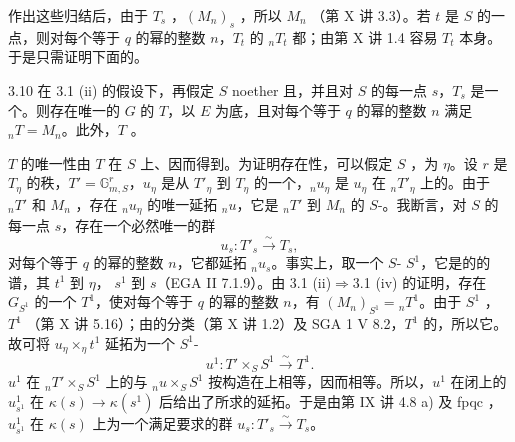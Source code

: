 作出这些归结后，由于 $T_s$ ，$(M_n)_s$ ，所以 $M_n$ （第 X 讲 3.3）。若 $t$ 是 $S$ 的一点，则对每个等于 $q$ 的幂的整数 $n$，$T_t$ 的 ${}_nT_t$ 都；由第 X 讲 1.4 容易 $T_t$ 本身。于是只需证明下面的。
\begin{SGAresult}{}{3.10}
在 3.1 (ii) 的假设下，再假定 $S$ noether 且，并且对 $S$ 的每一点 $s$，$T_s$ 是一个。则存在唯一的 $G$ 的 $T$，以 $E$ 为底，且对每个等于 $q$ 的幂的整数 $n$ 满足 ${}_nT=M_n$。此外，$T$ 。
\end{SGAresult}
$T$ 的唯一性由 $T$ 在 $S$ 上、因而得到。为证明存在性，可以假定 $S$ ，为 $\eta$。设 $r$ 是 $T_\eta$ 的秩，$T'=\mathbb G_{m,S}^r$，$u_\eta$ 是从 $T'_\eta$ 到 $T_\eta$ 的一个，${}_nu_\eta$ 是 $u_\eta$ 在 ${}_nT'_\eta$ 上的。由于 ${}_nT'$ 和 $M_n$ ，存在 ${}_nu_\eta$ 的唯一延拓 ${}_nu$，它是 ${}_nT'$ 到 $M_n$ 的 $S$-。我断言，对 $S$ 的每一点 $s$，存在一个必然唯一的群
\[u_s:T'_s\xrightarrow{\sim}T_s,\]
对每个等于 $q$ 的幂的整数 $n$，它都延拓 ${}_nu_s$。事实上，取一个 $S$- $S^1$，它是的的谱，其 $t^1$ 到 $\eta$， $s^1$ 到 $s$（EGA II 7.1.9）。由 3.1 (ii)$\Rightarrow$3.1 (iv) 的证明，存在 $G_{S^1}$ 的一个 $T^1$，使对每个等于 $q$ 的幂的整数 $n$，有 $(M_n)_{S^1}={}_nT^1$。由于 $S^1$ ，$T^1$ （第 X 讲 5.16）；由的分类（第 X 讲 1.2）及 SGA 1 V 8.2，$T^1$ 的，所以它。故可将 $u_\eta\times_\eta t^1$ 延拓为一个 $S^1$-
\[u^1:T'\times_S S^1\xrightarrow{\sim}T^1.\]
$u^1$ 在 ${}_nT'\times_S S^1$ 上的与 ${}_nu\times_S S^1$ 按构造在上相等，因而相等。所以，$u^1$ 在闭上的 $u^1_{s^1}$ 在 $\kappa(s)\to\kappa(s^1)$ 后给出了所求的延拓。于是由第 IX 讲 4.8 a) 及 fpqc ，$u^1_{s^1}$ 在 $\kappa(s)$ 上为一个满足要求的群 $u_s:T'_s\xrightarrow{\sim}T_s$。

